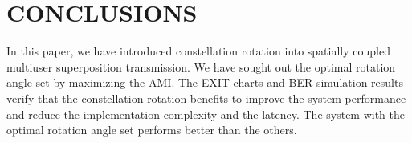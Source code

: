 \documentclass[conference]{IEEEtran}
\begin{document}
\section{CONCLUSIONS}
In this paper, we have introduced constellation rotation into spatially coupled multiuser superposition transmission. We have sought out the optimal rotation angle set by maximizing the AMI. The EXIT charts and BER simulation results verify that the constellation rotation benefits to improve the system performance and reduce the implementation complexity and the latency. The system with the optimal rotation angle set performs better than the others.








\end{document}
